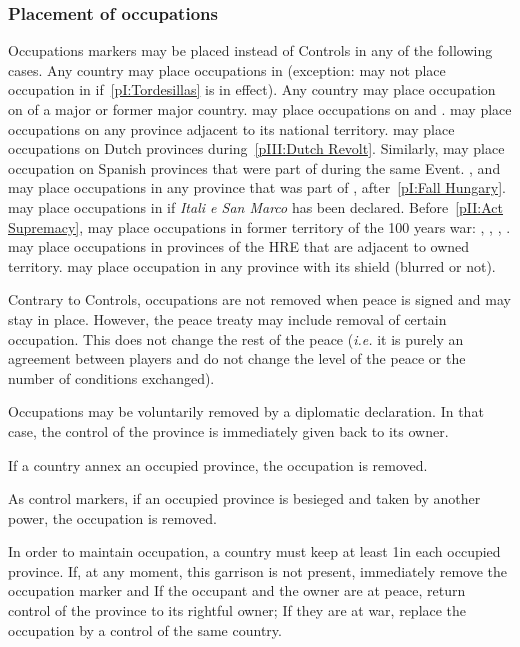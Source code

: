 \subsubsection{Placement of occupations}
\aparag Occupations markers may be placed instead of Controls in any
of the following cases.
\bparag Any country may place occupations in \continentCaraibes (exception:
\POR may not place occupation in \continentCaraibes if~\ref{pI:Tordesillas} is
in effect).
\bparag[] [TBD] Any country may place occupation on \TP of a major or
former major country.
\bparag \POR may place occupations on \paysOman and \paysAden.
\bparag \RUS may place occupations on any province adjacent to its
national territory.
\bparag \HIS may place occupations on Dutch provinces
during~\ref{pIII:Dutch Revolt}. Similarly, \HOL may place occupation
on Spanish provinces that were part of \paysBourgogne during the same
Event.
\bparag \TUR, \AUS and \POL may place occupations in any province that
was part of \paysHongrie, after~\ref{pI:Fall Hungary}.
\bparag[] [TBD] \VEN may place occupations in \regionItalie if
\emph{Itali e San Marco} has been declared.
\bparag[] [TBD] Before~\ref{pII:Act Supremacy}, \ANG may place
occupations in former territory of the 100 years war:
\provinceGuyenne, \provinceQuercy, \provincePoitou, \provincePicardie.
\bparag \FRA may place occupations in provinces of the HRE that are
adjacent to owned territory.
\bparag \paysSavoie may place occupation in any province with its
shield (blurred or not).

\aparag Contrary to Controls, occupations are not removed when peace
is signed and may stay in place.
\bparag However, the peace treaty may include removal of certain
occupation. This does not change the rest of the peace (\emph{i.e.} it
is purely an agreement between players and do not change the level of
the peace or the number of conditions exchanged).

\aparag Occupations may be voluntarily removed by a diplomatic
declaration. In that case, the control of the province is immediately
given back to its owner.

\aparag If a country annex an occupied province, the occupation is
removed.

\aparag As control markers, if an occupied province is besieged and
taken by another power, the occupation is removed.

\aparag In order to maintain occupation, a country must keep at least
1\LD in each occupied province. If, at any moment, this garrison is
not present, immediately remove the occupation marker and
\bparag If the occupant and the owner are at peace, return
control of the province to its rightful owner;
\bparag If they are at war, replace the occupation by a control of the
same country.

